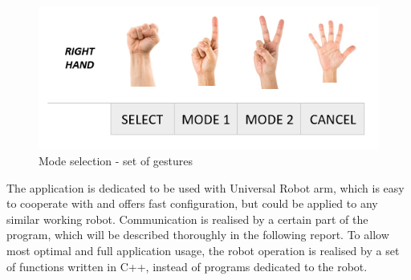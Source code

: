 \begin{figure}[H]
	\includegraphics{mode_selection}
	\centering
	\caption{Mode selection - set of gestures}
	\label{fig:mode}
\end{figure}


The application is dedicated to be used with Universal Robot arm, which is easy to cooperate with and offers fast configuration, but could be applied to any similar working robot. Communication is realised by a certain part of the program, which will be described thoroughly in the following report. To allow most optimal and full application usage, the robot operation is realised by a set of functions written in C++, instead of programs dedicated to the robot.
